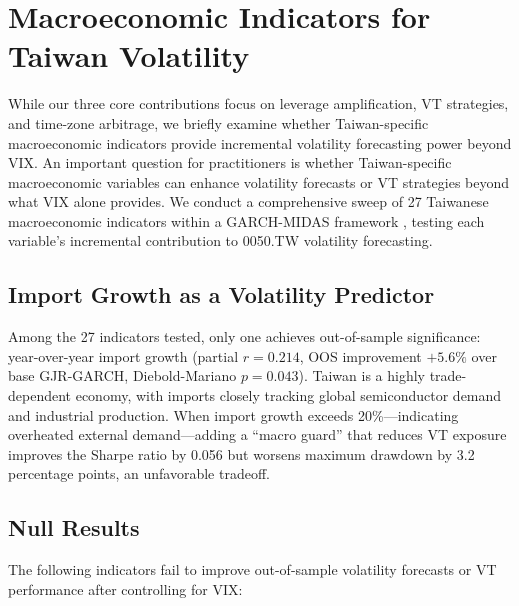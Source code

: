 
\section{Macroeconomic Indicators for Taiwan Volatility}
\label{sec:macro}

While our three core contributions focus on leverage amplification, VT strategies, and time-zone arbitrage, we briefly examine whether Taiwan-specific macroeconomic indicators provide incremental volatility forecasting power beyond VIX. An important question for practitioners is whether Taiwan-specific macroeconomic variables can enhance volatility forecasts or VT strategies beyond what VIX alone provides. We conduct a comprehensive sweep of 27 Taiwanese macroeconomic indicators within a GARCH-MIDAS framework \citep{engle2013}, testing each variable's incremental contribution to 0050.TW volatility forecasting.

\subsection{Import Growth as a Volatility Predictor}

Among the 27 indicators tested, only one achieves out-of-sample significance: year-over-year import growth (partial $r = 0.214$, OOS improvement $+5.6\%$ over base GJR-GARCH, Diebold-Mariano $p = 0.043$). Taiwan is a highly trade-dependent economy, with imports closely tracking global semiconductor demand and industrial production. When import growth exceeds 20\%---indicating overheated external demand---adding a ``macro guard'' that reduces VT exposure improves the Sharpe ratio by 0.056 but worsens maximum drawdown by 3.2 percentage points, an unfavorable tradeoff.

\subsection{Null Results}

The following indicators fail to improve out-of-sample volatility forecasts or VT performance after controlling for VIX:

